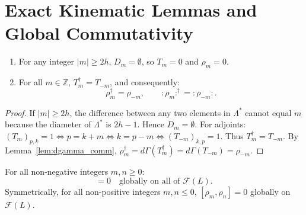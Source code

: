\section{Exact Kinematic Lemmas and Global Commutativity}

\begin{lemma}
\label{lem:density_vanishing_adj}
\begin{enumerate}
    \item For any integer $|m| \ge 2h$, $D_m = \emptyset$, so $T_m = 0$ and $\rho_m = 0$.
    \item For all $m \in \mathbb{Z}$, $T_m^\dagger = T_{-m}$, and consequently:
    \begin{equation}
    \rho_m^\dagger = \rho_{-m}, \qquad :\!\rho_m\!:^\dagger = :\!\rho_{-m}\!:.
    \end{equation}
\end{enumerate}
\end{lemma}

\begin{proof}
If $|m| \ge 2h$, the difference between any two elements in $\Lambda^*$ cannot equal $m$ because the diameter of $\Lambda^*$ is $2h - 1$. Hence $D_m = \emptyset$.
For adjoints: $(T_m)_{p, k} = 1 \iff p = k + m \iff k = p - m \iff (T_{-m})_{k, p} = 1$. Thus $T_m^\dagger = T_{-m}$. By Lemma~\ref{lem:dgamma_comm}, $\rho_m^\dagger = d\Gamma(T_m^\dagger) = d\Gamma(T_{-m}) = \rho_{-m}$.
\end{proof}

\begin{theorem}
\label{thm:same_sign_comm}
For all non-negative integers $m, n \ge 0$:
\begin{equation}
[\rho_m, \rho_n] = 0 \quad \text{globally on all of } \mathcal{F}(L).
\end{equation}
Symmetrically, for all non-positive integers $m, n \le 0$, $[\rho_m, \rho_n] = 0$ globally on $\mathcal{F}(L)$.
\end{theorem}

